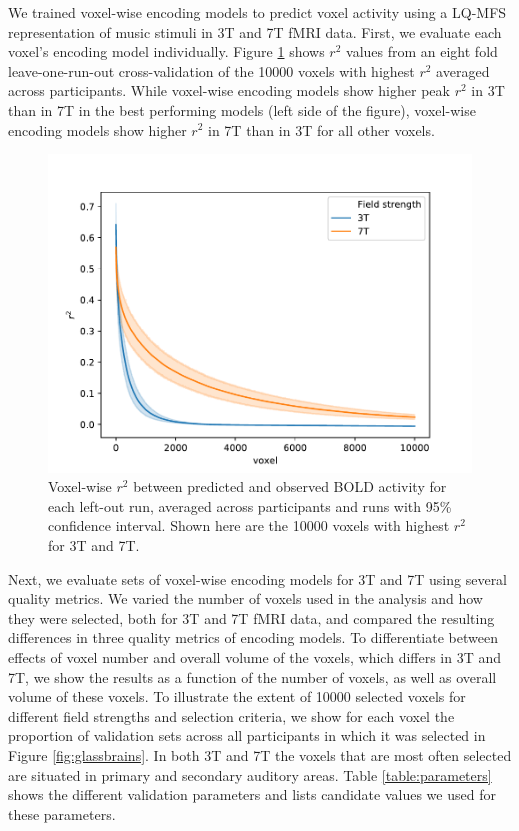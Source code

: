 We trained voxel-wise encoding models to predict voxel activity using a LQ-MFS representation of music stimuli in 3T and 7T f{MRI} data.
First, we evaluate each voxel's encoding model individually. Figure \ref{fig:r2_plot} shows $r^{2}$ values from an eight fold leave-one-run-out cross-validation of the 10000 voxels with highest $r^{2}$ averaged across participants. While voxel-wise encoding models show higher peak $r^{2}$ in 3T than in 7T in the best performing models (left side of the figure), voxel-wise encoding models show higher $r^{2}$ in 7T than in 3T for all other voxels.

\begin{figure}
  \centering
  \includegraphics[width=\linewidth]{pics/r2_plot.pdf}
	
    \caption{Voxel-wise $r^{2}$ between predicted and observed BOLD activity for each left-out run, averaged across participants and runs with 95\% confidence interval. Shown here are the 10000 voxels with highest $r^{2}$ for 3T and 7T.
  }

 \label{fig:r2_plot}\end{figure}

Next, we evaluate sets of voxel-wise encoding models for 3T and 7T using several quality metrics. We varied the number of voxels used in the analysis and how they were selected, both for 3T and 7T f{MRI} data, and compared the resulting differences in three quality metrics of encoding models. To differentiate between effects of voxel number and overall volume of the voxels, which differs in 3T and 7T, we show the results as a function of the number of voxels, as well as overall volume of these voxels.
To illustrate the extent of 10000 selected voxels for different field strengths and selection criteria, we show for each voxel the proportion of validation sets across all participants in which it was selected in Figure \ref{fig:glassbrains}. In both 3T and 7T the voxels that are most often selected are situated in primary and secondary auditory areas.
Table \ref{table:parameters} shows the different validation parameters and lists candidate values we used for these parameters.

